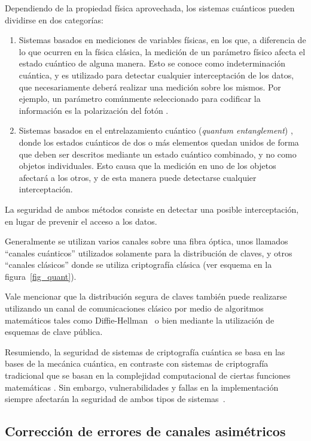Dependiendo de la propiedad física aprovechada, los sistemas cuánticos pueden dividirse en dos categorías:
\begin{enumerate}
 \item Sistemas basados en mediciones de variables físicas, en los que, a diferencia de lo que ocurren en la física clásica, la medición de un parámetro físico afecta el estado cuántico de alguna manera. Esto se conoce como indeterminación cuántica, y es utilizado para detectar cualquier interceptación de los datos, que necesariamente deberá realizar una medición sobre los mismos. Por ejemplo, un parámetro comúnmente seleccionado para codificar la información es la polarización del fotón \cite{muller1993experimental}.
 \item Sistemas basados en el entrelazamiento cuántico (\textit{quantum entanglement}) \cite{jennewein2000quantum}, donde los estados cuánticos de dos o más elementos quedan unidos de forma que deben ser descritos mediante un estado cuántico combinado, y no como objetos individuales. Esto causa que la medición en uno de los objetos afectará a los otros, y de esta manera puede detectarse cualquier interceptación.
\end{enumerate}

La seguridad de ambos métodos consiste en detectar una posible interceptación, en lugar de prevenir el acceso a los datos.

Generalmente se utilizan varios canales sobre una fibra óptica, unos llamados ``canales cuánticos'' utilizados solamente para la distribución de claves, y otros ``canales clásicos'' donde se utiliza criptografía clásica (ver esquema en la figura~\ref{fig_quant}).

Vale mencionar que la distribución segura de claves también puede realizarse utilizando un canal de comunicaciones clásico por medio de algoritmos matemáticos tales como Diffie-Hellman~\cite{diffie1976new} o bien mediante la utilización de esquemas de clave pública.

Resumiendo, la seguridad de sistemas de criptografía cuántica se basa en las bases de la mecánica cuántica, en contraste con sistemas de criptografía tradicional que se basan en la complejidad computacional de ciertas funciones matemáticas \cite{kohnfelder1978towards}. Sin embargo, vulnerabilidades y fallas en la implementación siempre afectarán la seguridad de ambos tipos de sistemas~\cite{lydersen2010hacking}.


\subsection{Corrección de errores de canales asimétricos}

